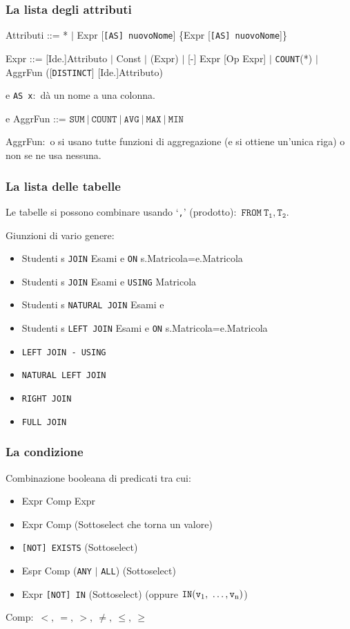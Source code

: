 \newpage

\subsubsection{La lista degli attributi}
Attributi ::= * $|$ Expr [\texttt{[AS] nuovoNome}] \{Expr [\texttt{[AS] nuovoNome}]\}

\noindent Expr ::= [Ide.]Attributo $|$ Const $|$ (Expr) $|$ [-] Expr [Op Expr] $|$ \texttt{COUNT}(*) $|$ AggrFun ([\texttt{DISTINCT}] [Ide.]Attributo)

\noindent e \texttt{AS x}:\ dà un nome a una colonna.

\noindent e AggrFun ::= $ \mathtt{SUM}\ |\ \mathtt{COUNT}\ |\ \mathtt{AVG}\ |\ \mathtt{MAX}\ |\ \mathtt{MIN}$

\noindent AggrFun:\ o si usano tutte funzioni di aggregazione (e si ottiene un'unica riga) o non se ne usa nessuna.

\subsubsection{La lista delle tabelle}
Le tabelle si possono combinare usando `\texttt{,}' (prodotto):\ $\mathtt{FROM\ T_1,T_2}$.

Giunzioni di vario genere:
\begin{itemize}
	\item Studenti s \texttt{JOIN} Esami e \texttt{ON} s.Matricola=e.Matricola
	\item Studenti s \texttt{JOIN} Esami e \texttt{USING} Matricola
	\item Studenti s \texttt{NATURAL JOIN} Esami e
	\item Studenti s \texttt{LEFT JOIN} Esami e \texttt{ON} s.Matricola=e.Matricola
	\item \texttt{LEFT JOIN - USING}
	\item \texttt{NATURAL LEFT JOIN}
	\item \texttt{RIGHT JOIN}
	\item \texttt{FULL JOIN}
\end{itemize}

\subsubsection{La condizione}

Combinazione booleana di predicati tra cui:
\begin{itemize}
	\item Expr Comp Expr
	\item Expr Comp (Sottoselect che torna un valore)
	\item \texttt{[NOT] EXISTS} (Sottoselect)
	\item Espr Comp (\texttt{ANY} $|$ \texttt{ALL}) (Sottoselect)
	\item Expr \texttt{[NOT] IN} (Sottoselect) (oppure $\mathtt{IN (v\textsubscript{1},\ \dots,v\textsubscript{n})}$)
\end{itemize}
Comp:\ $<,\ =,\ >,\ \neq,\ \leq,\ \geq$

